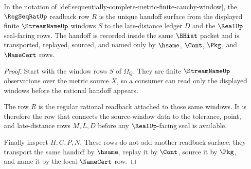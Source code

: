 \begin{theorem}
\label{thm:sequentially-complete-metric-regseqrat-handoff}
In the notation of \autoref{def:sequentially-complete-metric-finite-cauchy-window}, the $\RegSeqRatUp$ readback row $R$ is the unique handoff surface from the displayed finite $\StreamNameUp$ windows $S$ to the late-distance ledger $D$ and the $\RealUp$ seal-facing rows. The handoff is recorded inside the same $\BHist$ packet and is transported, replayed, sourced, and named only by $\hsame$, $\Cont$, $\Pkg$, and $\NameCert$ rows.
\end{theorem}
\begin{proof}
Start with the window rows $S$ of $\Omega_Q$. They are finite $\StreamNameUp$ observations over the metric source $X$, so a consumer can read only the displayed windows before the rational handoff appears.

The row $R$ is the regular rational readback attached to those same windows. It is therefore the row that connects the source-window data to the tolerance, point, and late-distance rows $M,L,D$ before any $\RealUp$-facing seal is available.

Finally inspect $H,C,P,N$. These rows do not add another readback surface; they transport the same handoff by $\hsame$, replay it by $\Cont$, source it by $\Pkg$, and name it by the local $\NameCert$ row.
\end{proof}

